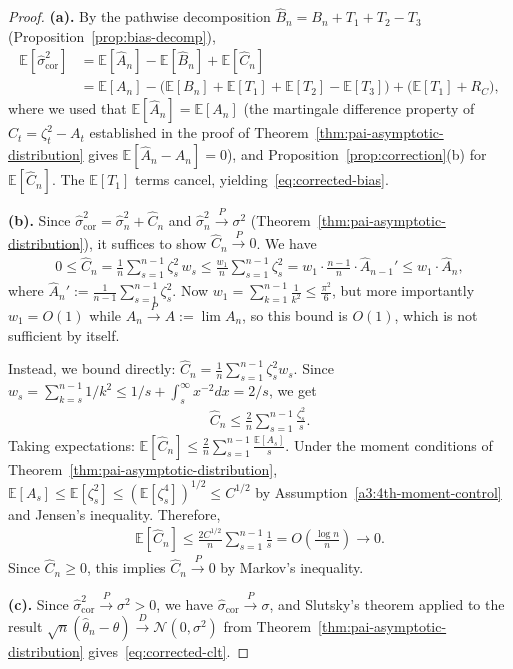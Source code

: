 \documentclass[11pt]{article}
\newcommand{\thetahat}{\hat{\theta}}
\newcommand{\sigmahat}{\hat{\sigma}}
\newcommand{\Bhat}{\hat{B}}
\newcommand{\Ahat}{\hat{A}}
\newcommand{\Chat}{\hat{C}}
\newcommand{\toP}{\xrightarrow{P}}
\newcommand{\toD}{\xrightarrow{D}}
\begin{document}
\begin{proof}
    \textbf{(a).} By the pathwise decomposition $\Bhat_n = B_n + T_1 + T_2 - T_3$ (Proposition~\ref{prop:bias-decomp}),
    \begin{align*}
        \mathbb{E}[\sigmahat_{\mathrm{cor}}^2] &= \mathbb{E}[\Ahat_n] - \mathbb{E}[\Bhat_n] + \mathbb{E}[\Chat_n] \\
        &= \mathbb{E}[A_n] - \bigl(\mathbb{E}[B_n] + \mathbb{E}[T_1] + \mathbb{E}[T_2] - \mathbb{E}[T_3]\bigr) + \bigl(\mathbb{E}[T_1] + R_C\bigr),
    \end{align*}
    where we used that $\mathbb{E}[\Ahat_n] = \mathbb{E}[A_n]$ (the martingale difference property of $C_t = \zeta_t^2 - A_t$ established in the proof of Theorem~\ref{thm:pai-asymptotic-distribution} gives $\mathbb{E}[\Ahat_n - A_n] = 0$), and Proposition~\ref{prop:correction}(b) for $\mathbb{E}[\Chat_n]$. The $\mathbb{E}[T_1]$ terms cancel, yielding~\eqref{eq:corrected-bias}.

    \textbf{(b).} Since $\sigmahat_{\mathrm{cor}}^2 = \sigmahat_n^2 + \Chat_n$ and $\sigmahat_n^2 \toP \sigma^2$ (Theorem~\ref{thm:pai-asymptotic-distribution}), it suffices to show $\Chat_n \toP 0$. We have
    \begin{align*}
        0 \leq \Chat_n = \frac{1}{n}\sum_{s=1}^{n-1}\zeta_s^2\,w_s \leq \frac{w_1}{n}\sum_{s=1}^{n-1}\zeta_s^2 = w_1 \cdot \frac{n-1}{n}\cdot\Ahat_{n-1}' \leq w_1 \cdot \Ahat_n,
    \end{align*}
    where $\Ahat_n' := \frac{1}{n-1}\sum_{s=1}^{n-1}\zeta_s^2$. Now $w_1 = \sum_{k=1}^{n-1}\frac{1}{k^2} \leq \frac{\pi^2}{6}$, but more importantly $w_1 = O(1)$ while $\Ahat_n \toP A := \lim A_n$, so this bound is $O(1)$, which is not sufficient by itself.

    Instead, we bound directly: $\Chat_n = \frac{1}{n}\sum_{s=1}^{n-1}\zeta_s^2 w_s$. Since $w_s = \sum_{k=s}^{n-1}1/k^2 \leq 1/s + \int_s^\infty x^{-2}dx = 2/s$, we get
    \begin{align*}
        \Chat_n \leq \frac{2}{n}\sum_{s=1}^{n-1}\frac{\zeta_s^2}{s}.
    \end{align*}
    Taking expectations: $\mathbb{E}[\Chat_n] \leq \frac{2}{n}\sum_{s=1}^{n-1}\frac{\mathbb{E}[A_s]}{s}$. Under the moment conditions of Theorem~\ref{thm:pai-asymptotic-distribution}, $\mathbb{E}[A_s] \leq \mathbb{E}[\zeta_s^2] \leq (\mathbb{E}[\zeta_s^4])^{1/2} \leq C^{1/2}$ by Assumption~\ref{a3:4th-moment-control} and Jensen's inequality. Therefore,
    \begin{align*}
        \mathbb{E}[\Chat_n] \leq \frac{2C^{1/2}}{n}\sum_{s=1}^{n-1}\frac{1}{s} = O\!\left(\frac{\log n}{n}\right) \to 0.
    \end{align*}
    Since $\Chat_n \geq 0$, this implies $\Chat_n \toP 0$ by Markov's inequality.

    \textbf{(c).} Since $\sigmahat_{\mathrm{cor}}^2 \toP \sigma^2 > 0$, we have $\sigmahat_{\mathrm{cor}} \toP \sigma$, and Slutsky's theorem applied to the result $\sqrt{n}(\thetahat_n - \theta) \toD \mathcal{N}(0, \sigma^2)$ from Theorem~\ref{thm:pai-asymptotic-distribution} gives~\eqref{eq:corrected-clt}.
\end{proof}
\end{document}
